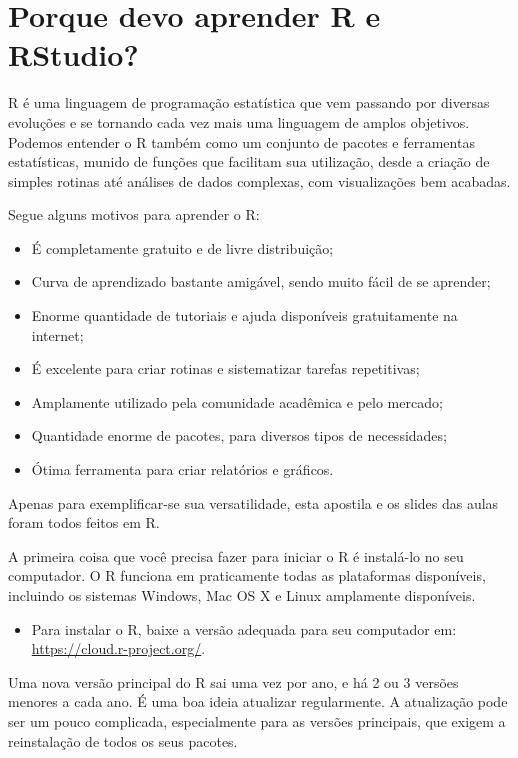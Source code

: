 \documentclass[]{book}
\providecommand{\tightlist}{%
  \setlength{\itemsep}{0pt}\setlength{\parskip}{0pt}}
\begin{document}
\hypertarget{porque-devo-aprender-r-e-rstudio}{%
\section{Porque devo aprender R e RStudio?}\label{porque-devo-aprender-r-e-rstudio}}

R é uma linguagem de programação estatística que vem passando por diversas evoluções e se tornando cada vez mais uma linguagem de amplos objetivos. Podemos entender o R também como um conjunto de pacotes e ferramentas estatísticas, munido de funções que facilitam sua utilização, desde a criação de simples rotinas até análises de dados complexas, com visualizações bem acabadas.

Segue alguns motivos para aprender o R:

\begin{itemize}
\tightlist
\item
  É completamente gratuito e de livre distribuição;
\item
  Curva de aprendizado bastante amigável, sendo muito fácil de se aprender;
\item
  Enorme quantidade de tutoriais e ajuda disponíveis gratuitamente na internet;
\item
  É excelente para criar rotinas e sistematizar tarefas repetitivas;
\item
  Amplamente utilizado pela comunidade acadêmica e pelo mercado;
\item
  Quantidade enorme de pacotes, para diversos tipos de necessidades;
\item
  Ótima ferramenta para criar relatórios e gráficos.
\end{itemize}

Apenas para exemplificar-se sua versatilidade, esta apostila e os slides das aulas foram todos feitos em R.

A primeira coisa que você precisa fazer para iniciar o R é instalá-lo no seu computador. O R funciona em praticamente todas as plataformas disponíveis, incluindo os sistemas Windows, Mac OS X e Linux amplamente disponíveis.

\begin{itemize}
\tightlist
\item
  Para instalar o R, baixe a versão adequada para seu computador em: \url{https://cloud.r-project.org/}.
\end{itemize}

Uma nova versão principal do R sai uma vez por ano, e há 2 ou 3 versões menores a cada ano. É uma boa ideia atualizar regularmente. A atualização pode ser um pouco complicada, especialmente para as versões principais, que exigem a reinstalação de todos os seus pacotes.
\end{document}
